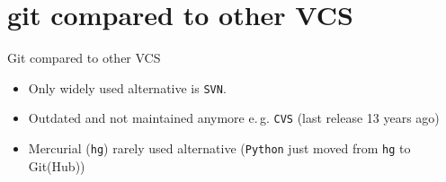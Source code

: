 \section{git compared to other VCS}\label{sec:comparison}


\begin{frame}[c]{Git compared to other VCS}
  \begin{itemize}
    \item Only widely used alternative is \texttt{SVN}.
    \item Outdated and not maintained anymore e.\,g. \texttt{CVS} (last release 13 years ago)
    \item Mercurial (\texttt{hg}) rarely used alternative (\texttt{Python} just moved from \texttt{hg} to Git(Hub))
  \end{itemize}
\end{frame}



